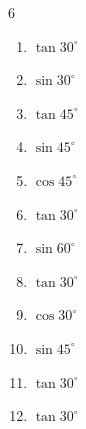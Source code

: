 \begin{multicols}{6}
\begin{enumerate}
  \item $\displaystyle \tan{30^\circ}$


  \item $\displaystyle \sin{30^\circ}$


  \item $\displaystyle \tan{45^\circ}$

        \phantom{$\displaystyle =1$}

  \item $\displaystyle \sin{45^\circ}$


  \item $\displaystyle \cos{45^\circ}$


  \item $\displaystyle \tan{30^\circ}$


\columnbreak %

  \item $\displaystyle \sin{60^\circ}$


  \item $\displaystyle \tan{30^\circ}$


  \item $\displaystyle \cos{30^\circ}$


  \item $\displaystyle \sin{45^\circ}$


  \item $\displaystyle \tan{30^\circ}$


  \item $\displaystyle \tan{30^\circ}$



\end{enumerate}
\end{multicols}
